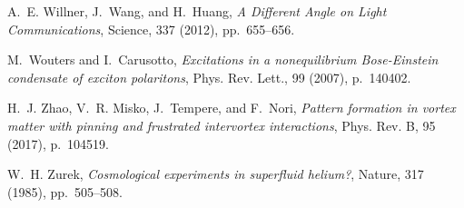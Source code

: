 \documentclass[aps,prb,twocolumn,superscriptaddress,nofootinbib]{revtex4}
\begin{document}
\begin{thebibliography}{10}
{\sc A.~E. Willner, J.~Wang, and H.~Huang}, {\em A {Different} {Angle} on
  {Light} {Communications}}, Science, 337 (2012), pp.~655--656.

{\sc M.~Wouters and I.~Carusotto}, {\em Excitations in a nonequilibrium
  {Bose-Einstein} condensate of exciton polaritons}, Phys. Rev. Lett., 99
  (2007), p.~140402.

{\sc H.~J. Zhao, V.~R. Misko, J.~Tempere, and F.~Nori}, {\em Pattern formation
  in vortex matter with pinning and frustrated intervortex interactions}, Phys.
  Rev. B, 95 (2017), p.~104519.

{\sc W.~H. Zurek}, {\em {Cosmological experiments in superfluid helium?}},
  Nature, 317 (1985), pp.~505--508.

\end{thebibliography}
\end{document}

